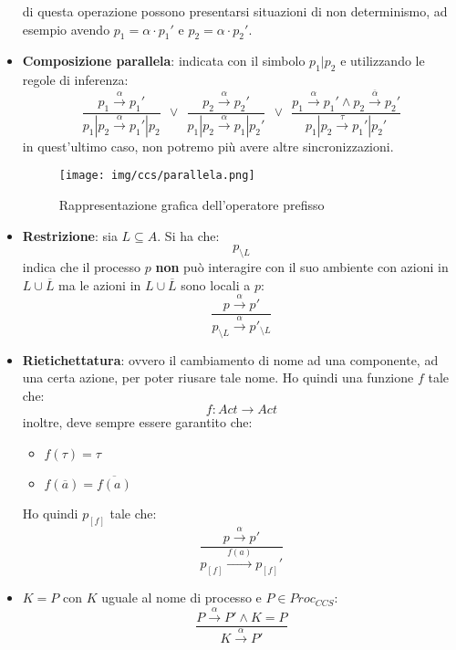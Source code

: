\begin{itemize}
          di questa operazione possono presentarsi situazioni di non determinismo,
          ad esempio avendo $p_1 = \alpha \cdot p_1'$ e $p_2 = \alpha \cdot p_2'$.
    \item \textbf{Composizione parallela}: indicata con il simbolo $p_1 | p_2$ e
          utilizzando le regole di inferenza:
          \begin{equation}
              \frac{p_1 \xrightarrow{\alpha} p_1'}{p_1 | p_2 \xrightarrow{\alpha} p_1' | p_2}
              \ \ \lor \ \
              \frac{p_2 \xrightarrow{\alpha} p_2'}{p_1 | p_2 \xrightarrow{\alpha} p_1 | p_2'}
              \ \ \lor \ \
              \frac{p_1 \xrightarrow{\alpha} p_1' \land p_2 \xrightarrow{\overline{\alpha}} p_2'}{p_1 | p_2 \xrightarrow{\tau} p_1' | p_2'}
          \end{equation}
          in quest'ultimo caso, non potremo più avere altre sincronizzazioni.
          \begin{figure}[!ht]
              \centering
              \texttt{[image: img/ccs/parallela.png]}
              \caption{Rappresentazione grafica dell'operatore prefisso}
          \end{figure}
    \item \textbf{Restrizione}: sia $L \subseteq A$. Si ha che:
          \begin{equation}
              p_{\setminus L}
          \end{equation}
          indica che il processo $p$ \textbf{non} può interagire con il suo
          ambiente con azioni in $L \cup \overline{L}$ ma le azioni in
          $L \cup \overline{L}$ sono locali a $p$:
          \begin{equation}
              \frac{p \xrightarrow{\alpha} p'}{ p_{\setminus L} \xrightarrow{\alpha} p'_{\setminus L}}
          \end{equation}
    \item \textbf{Rietichettatura}: ovvero il cambiamento di nome ad una
          componente, ad una certa azione, per poter riusare tale nome. Ho quindi una
          funzione $f$ tale che:
          \begin{equation}
              f: Act \to Act
          \end{equation}
          inoltre, deve sempre essere garantito che:
          \begin{itemize}
              \item $f(\tau) = \tau$
              \item $f(\overline{a}) = \overline{f(a)}$
          \end{itemize}
          Ho quindi $p_{[f]}$ tale che:
          \begin{equation}
              \frac{p \xrightarrow{\alpha} p'}{p_{[f]} \xrightarrow{f(a)} p_{[f]}'}
          \end{equation}
    \item $K = P$ con $K$ uguale al nome di processo e $P \in Proc_{CCS}$:
          \begin{equation}
              \frac{P \xrightarrow{\alpha} P' \land K = P}{K \xrightarrow{\alpha} P'}
          \end{equation}
\end{itemize}
